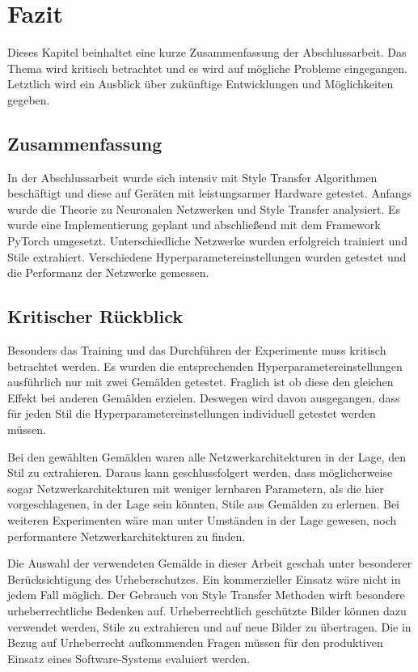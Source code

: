 \chapter{Fazit}

Dieses Kapitel beinhaltet eine kurze Zusammenfassung der Abschlussarbeit. Das Thema wird kritisch betrachtet und es wird auf mögliche Probleme eingegangen. Letztlich wird ein Ausblick über zukünftige Entwicklungen und Möglichkeiten gegeben.

\section{Zusammenfassung}

In der Abschlussarbeit wurde sich intensiv mit Style Transfer Algorithmen beschäftigt und diese auf Geräten mit leistungsarmer Hardware getestet. Anfangs wurde die Theorie zu Neuronalen Netzwerken und Style Transfer analysiert. Es wurde eine Implementierung geplant und abschließend mit dem Framework PyTorch umgesetzt. Unterschiedliche Netzwerke wurden erfolgreich trainiert und Stile extrahiert. Verschiedene Hyperparametereinstellungen wurden getestet und die Performanz der Netzwerke gemessen.


\section{Kritischer Rückblick}

Besonders das Training und das Durchführen der Experimente muss kritisch betrachtet werden. Es wurden die entsprechenden Hyperparametereinstellungen ausführlich nur mit zwei Gemälden getestet. Fraglich ist ob diese den gleichen Effekt bei anderen Gemälden erzielen. Deswegen wird davon ausgegangen, dass für jeden Stil die Hyperparametereinstellungen individuell getestet werden müssen.

Bei den gewählten Gemälden waren alle Netzwerkarchitekturen in der Lage, den Stil zu extrahieren. Daraus kann geschlussfolgert werden, dass möglicherweise sogar Netzwerkarchitekturen mit weniger lernbaren Parametern, als die hier vorgeschlagenen, in der Lage sein könnten, Stile aus Gemälden zu erlernen. Bei weiteren Experimenten wäre man unter Umständen in der Lage gewesen, noch performantere Netzwerkarchitekturen zu finden.

Die Auswahl der verwendeten Gemälde in dieser Arbeit geschah unter besonderer Berücksichtigung des Urheberschutzes. Ein kommerzieller Einsatz wäre nicht in jedem Fall möglich. Der Gebrauch von Style Transfer Methoden wirft besondere urheberrechtliche Bedenken auf. Urheberrechtlich geschützte Bilder können dazu verwendet werden, Stile zu extrahieren und auf neue Bilder zu übertragen. Die in Bezug auf Urheberrecht aufkommenden Fragen müssen für den produktiven Einsatz eines Software-Systems evaluiert werden.

